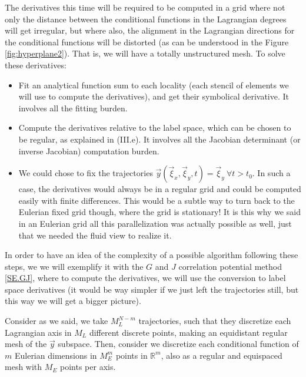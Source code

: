 \documentclass[11pt, a4paper]{article} %
\newcommand{\R}{\mathbb{R}} %
\begin{document}
The derivatives this time will be required to be computed in a grid where not only the distance between the conditional functions in the Lagrangian degrees will get irregular, but where also, the alignment in the Lagrangian directions for the conditional functions will be distorted (as can be understood in the Figure \ref{fig:hyperplane2}). That is, we will have a totally unstructured mesh. To solve these derivatives:
\begin{itemize}
\item Fit an analytical function sum to each locality (each stencil of elements we will use to compute the derivatives), and get their symbolical derivative. It involves all the fitting burden.
\item Compute the derivatives relative to the label space, which can be chosen to be regular, as explained in (III.e). It involves all the Jacobian determinant (or inverse Jacobian) computation burden.
\item We could chose to fix the trajectories $\vec{y}(\vec{\xi}_x, \vec{\xi}_y,t)=\vec{\xi}_y\ \forall t>t_0$. In such a case, the derivatives would always be in a regular grid and could be computed easily with finite differences. This would be a subtle way to turn back to the Eulerian fixed grid though, where the grid is stationary! It is this why we said in an Eulerian grid all this parallelization was actually possible as well, just that we needed the fluid view to realize it.
\end{itemize}

In order to have an idea of the complexity of a possible algorithm following these steps, we we will exemplify it with the $G$ and $J$ correlation potential method \eqref{SE.GJ}, where to compute the derivatives, we will use the conversion to label space derivatives (it would be way simpler if we just left the trajectories still, but this way we will get a bigger picture).

Consider as we said, we take $M_L^{N-m}$ trajectories, such that they discretize each Lagrangian axis in $M_{L}$ different discrete points, making an equidistant regular mesh of the $\vec{y}$ subspace. Then, consider we discretize each conditional function of $m$ Eulerian dimensions in $M_E^m$ points in $\R^m$, also as a regular and equispaced mesh with $M_E$ points per axis.
\end{document}
